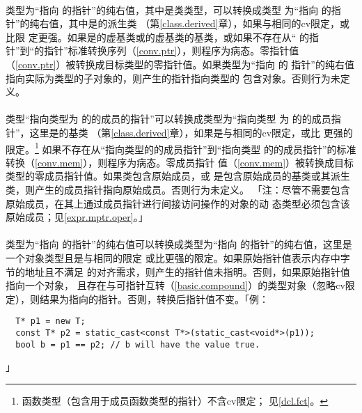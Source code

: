 \paragraph{}
类型为``指向 的指针''的纯右值，其中是类类型，可以转换成类型
为``指向 的指针''的纯右值，其中是的派生类
（第\ref{class.derived}章），如果与相同的cv限定，或比限
定更强。如果是的虚基类或的虚基类的基类，或如果不存在从``
的指针''到``的指针''标准转换序列（\ref{conv.ptr}），则程序为病态。零指针值
（\ref{conv.ptr}）被转换成目标类型的零指针值。如果类型为``指向 的
指针''的纯右值指向实际为类型的子对象的，则产生的指针指向类型的
包含对象。否则行为未定义。

\paragraph{}
类型``指向类型为 的的成员的指针''可以转换成类型为``指向类型
为 的的成员指针''，这里是的基类
（第\ref{class.derived}章），如果是与相同的cv限定，或比
更强的限定。\footnote{函数类型（包含用于成员函数类型的指针）不含cv限定；
见\ref{dcl.fct}。} 如果不存在从``指向类型的的成员指针''到``指向类型
的的成员指针''的标准转换（\ref{conv.mem}），则程序为病态。零成员指针
值（\ref{conv.mem}）被转换成目标类型的零成员指针值。如果类包含原始成员，或
是包含原始成员的基类或其派生类，则产生的成员指针指向原始成员。否则行为未定义。
「注：尽管不需要包含原始成员，在其上通过成员指针进行间接访问操作的对象的动
态类型必须包含该原始成员；见\ref{expr.mptr.oper}。」

\paragraph{}
类型为``指向 的指针''的纯右值可以转换成类型为``指向
的指针''的纯右值，这里是一个对象类型且是与相同的限定
或比更强的限定。如果原始指针值表示内存中字节的地址且不满足
的对齐需求，则产生的指针值未指明。否则，如果原始指针值指向一个对象，
且存在与可指针互转（\ref{basic.compound}）的类型对象（忽略cv限
定），则结果为指向的指针。否则，转换后指针值不变。「例：
\begin{lstlisting}
  T* p1 = new T;
  const T* p2 = static_cast<const T*>(static_cast<void*>(p1));
  bool b = p1 == p2; // b will have the value true.
\end{lstlisting}」

